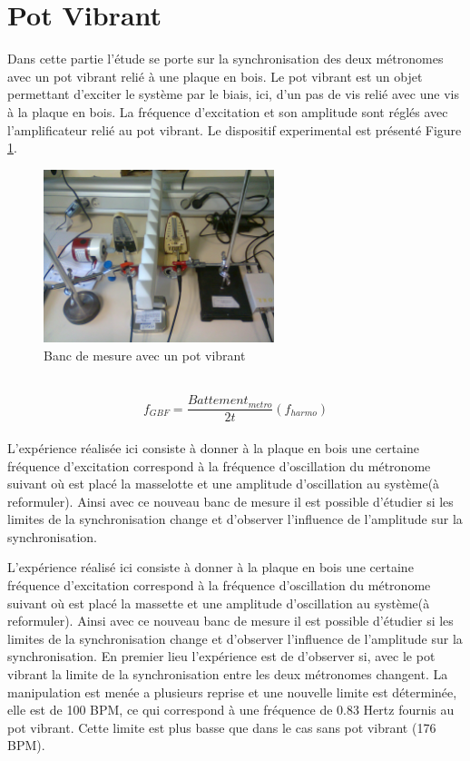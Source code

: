 \documentclass[a4paper,11pt]{report}
\begin{document}
\section{Pot Vibrant}
Dans cette partie l'étude se porte sur la synchronisation des deux métronomes avec un pot vibrant relié à une plaque en bois. Le pot vibrant est un objet permettant d'exciter le système par le biais, ici, d'un pas de vis relié avec une vis à la plaque en bois. La fréquence d'excitation et son amplitude sont réglés avec l'amplificateur relié au pot vibrant. Le dispositif experimental est présenté Figure \ref{BancPot}.
\begin{figure}[h]
\centering
\includegraphics[width=0.6\textwidth]{Bancpotvibrant}
\caption{Banc de mesure avec un pot vibrant}\label{BancPot}
\end{figure}\\

\begin{equation}
f_{GBF}=\frac{Battement_{metro}}{2t}(f_{harmo})
\label{fgbf}
\end{equation}\\

L'expérience réalisée ici consiste à donner à la plaque en bois une certaine fréquence d'excitation correspond à la fréquence d'oscillation du métronome	 suivant où est placé la masselotte et une amplitude d'oscillation au système(à reformuler).
Ainsi avec ce nouveau banc de mesure il est possible d'étudier si les limites de la synchronisation change et d'observer l'influence de l'amplitude sur la synchronisation.

 L'expérience réalisé ici consiste à donner à la plaque en bois une certaine fréquence d'excitation correspond à la fréquence d'oscillation du métronome suivant où est placé la massette et une amplitude d'oscillation au système(à reformuler).
Ainsi avec ce nouveau banc de mesure il est possible d'étudier si les limites de la synchronisation change et d'observer l'influence de l'amplitude sur la synchronisation. En premier lieu l'expérience est de d'observer si, avec le pot vibrant la limite de la synchronisation entre les deux métronomes changent. La manipulation est menée a plusieurs reprise et une nouvelle limite est déterminée, elle est de 100 BPM, ce qui correspond à une fréquence de 0.83 Hertz fournis au pot vibrant. Cette limite est plus basse que dans le cas sans pot vibrant (176 BPM).
\end{document}
